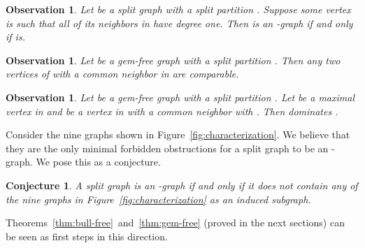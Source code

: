 \documentclass[11pt,3p,times]{elsarticle}
\newcommand{\proofBox}{\hfill }
\newtheorem{observation}[theorem]{Observation}
\newtheorem{conjecture}{Conjecture}
\begin{document}
\begin{observation}\label{obs:neighbor-degree-one}
Let  be a split graph  with a split partition . Suppose
some vertex  is such that all of its neighbors in 
have degree one. Then  is an -graph if and only if  is. \proofBox
\end{observation}
\begin{observation}\label{obs:gem-comparable}
Let  be a gem-free graph with a split partition . Then
any two vertices of  with a common neighbor in  are
comparable. \proofBox
\end{observation}
\begin{observation}\label{obs:gem-domination}
Let  be a gem-free graph with a split partition . Let
 be a maximal vertex in  and  be a vertex in  with a
common neighbor with . Then  dominates . 
\proofBox
\end{observation}

Consider the nine graphs shown in
Figure~\ref{fig:characterization}. We believe that they are the
only minimal forbidden obstructions for a split graph to be an
-graph. We pose this as a conjecture.

\begin{conjecture}
A split graph is an -graph if and only if it does not contain any of
the nine graphs in Figure~\ref{fig:characterization} as an induced
subgraph.
\end{conjecture}
Theorems~\ref{thm:bull-free}~and~\ref{thm:gem-free} (proved in the
next sections) can be seen as first steps in this direction.
\end{document}
